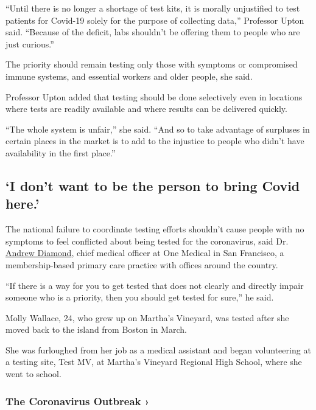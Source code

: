 ``Until there is no longer a shortage of test kits, it is morally
unjustified to test patients for Covid-19 solely for the purpose of
collecting data,'' Professor Upton said. ``Because of the deficit, labs
shouldn't be offering them to people who are just curious.''

The priority should remain testing only those with symptoms or
compromised immune systems, and essential workers and older people, she
said.

Professor Upton added that testing should be done selectively even in
locations where tests are readily available and where results can be
delivered quickly.

``The whole system is unfair,'' she said. ``And so to take advantage of
surpluses in certain places in the market is to add to the injustice to
people who didn't have availability in the first place.''

\hypertarget{i-dont-want-to-be-the-person-to-bring-covid-here}{%
\subsection{`I don't want to be the person to bring Covid
here.'}\label{i-dont-want-to-be-the-person-to-bring-covid-here}}

The national failure to coordinate testing efforts shouldn't cause
people with no symptoms to feel conflicted about being tested for the
coronavirus, said Dr.
\href{https://www.onemedical.com/providers/andrew-diamond/}{Andrew
Diamond}, chief medical officer at One Medical in San Francisco, a
membership-based primary care practice with offices around the country.

``If there is a way for you to get tested that does not clearly and
directly impair someone who is a priority, then you should get tested
for sure,'' he said.

Molly Wallace, 24, who grew up on Martha's Vineyard, was tested after
she moved back to the island from Boston in March.

She was furloughed from her job as a medical assistant and began
volunteering at a testing site, Test MV, at Martha's Vineyard Regional
High School, where she went to school.

\href{https://www.nytimes.com/news-event/coronavirus?action=click\&pgtype=Article\&state=default\&region=MAIN_CONTENT_3\&context=storylines_faq}{}

\hypertarget{the-coronavirus-outbreak-}{%
\subsubsection{The Coronavirus Outbreak
›}\label{the-coronavirus-outbreak-}}

